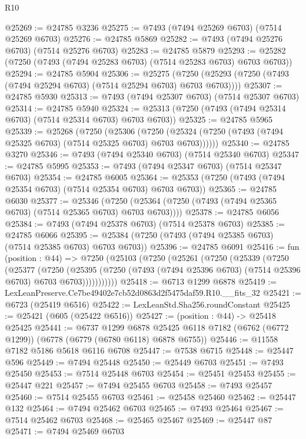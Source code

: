 \begin{lexlean}{R10}
\begin{coremodule}
@25269 := @24785 @3236
@25275 := @7493 (@7494 @25269 @6703) (@7514 @25269 @6703)
@25276 := @24785 @5869
@25282 := @7493 (@7494 @25276 @6703) (@7514 @25276 @6703)
@25283 := @24785 @5879
@25293 := @25282 (@7250 (@7493 (@7494 @25283 @6703) (@7514 @25283 @6703) @6703 @6703))
@25294 := @24785 @5904
@25306 := @25275
    (@7250 (@25293 (@7250 (@7493 (@7494 @25294 @6703) (@7514 @25294 @6703) @6703 @6703))))
@25307 := @24785 @5930
@25313 := @7493 (@7494 @25307 @6703) (@7514 @25307 @6703)
@25314 := @24785 @5940
@25324 := @25313 (@7250 (@7493 (@7494 @25314 @6703) (@7514 @25314 @6703) @6703 @6703))
@25325 := @24785 @5965
@25339 := @25268
    (@7250
      (@25306
        (@7250 (@25324 (@7250 (@7493 (@7494 @25325 @6703) (@7514 @25325 @6703) @6703 @6703))))))
@25340 := @24785 @3270
@25346 := @7493 (@7494 @25340 @6703) (@7514 @25340 @6703)
@25347 := @24785 @5995
@25353 := @7493 (@7494 @25347 @6703) (@7514 @25347 @6703)
@25354 := @24785 @6005
@25364 := @25353 (@7250 (@7493 (@7494 @25354 @6703) (@7514 @25354 @6703) @6703 @6703))
@25365 := @24785 @6030
@25377 := @25346
    (@7250 (@25364 (@7250 (@7493 (@7494 @25365 @6703) (@7514 @25365 @6703) @6703 @6703))))
@25378 := @24785 @6056
@25384 := @7493 (@7494 @25378 @6703) (@7514 @25378 @6703)
@25385 := @24785 @6066
@25395 := @25384 (@7250 (@7493 (@7494 @25385 @6703) (@7514 @25385 @6703) @6703 @6703))
@25396 := @24785 @6091
@25416 := fun (position : @44) =>
  @7250
    (@25103
      (@7250
        (@25261
          (@7250
            (@25339
              (@7250
                (@25377
                  (@7250
                    (@25395
                      (@7250 (@7493 (@7494 @25396 @6703) (@7514 @25396 @6703) @6703 @6703)))))))))))
@25418 := @6713 @1299 @6878
@25419 := LexLeanPreserve.Ce7be49402e7cb52d0863d2f5475daf59.R10.__fits_32
@25421 := @6723 (@25419 @6516)
@25422 := LexLeanStd.Sha256.roundConstant
@25425 := @25421 (@605 (@25422 @6516))
@25427 := (position : @44) -> @25418 @25425
@25441 := @6737
    @1299
    @6878
    @25425
    @6118
    @7182
    (@6762 (@6772 @1299))
    (@6778 (@6779 (@6780 @6118) @6878 @6755))
@25446 := @11558 @7182 @5186 @5618 @6116 @6708
@25447 := @7538 @6715
@25448 := @25447 @596
@25449 := @7494 @25448
@25450 := @25449 @6703
@25451 := @7493 @25450
@25453 := @7514 @25448 @6703
@25454 := @25451 @25453
@25455 := @25447 @221
@25457 := @7494 @25455 @6703
@25458 := @7493 @25457
@25460 := @7514 @25455 @6703
@25461 := @25458 @25460
@25462 := @25447 @132
@25464 := @7494 @25462 @6703
@25465 := @7493 @25464
@25467 := @7514 @25462 @6703
@25468 := @25465 @25467
@25469 := @25447 @87
@25471 := @7494 @25469 @6703

\end{coremodule}
\end{lexlean}
